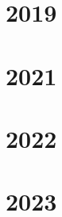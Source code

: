 \documentclass[10pt]{article}
\begin{document}
		

	\section{2019}

		

	\section{2021}

		

	\section{2022}

		

	\section{2023}

		
\end{document}
